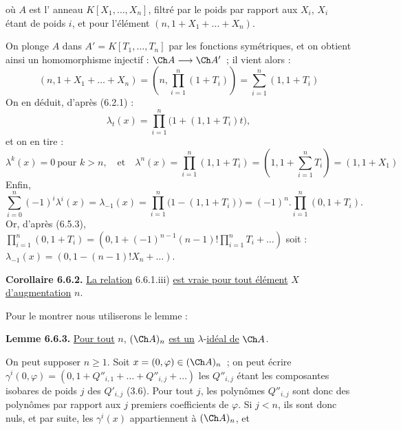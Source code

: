 
où \(A\) est l'%
anneau \(K[X_1,\ldots,X_n]\), filtré par le poids par rapport aux \(X_i\), \(X_i\) étant de poids \(i\), et pour l'élément \((n,1+X_1+\ldots+X_n)\).

On plonge \(A\) dans \(A'=K[T_1,\ldots,T_n]\) par les fonctions symétriques, et on obtient ainsi un homomorphisme injectif : \(\Ch A\longrightarrow\Ch A'\)~; il vient alors :
\[
 (n,1+X_1+\ldots+X_n)
 =
 \left(n,\prod_{i=1}^n(1+T_i)\right)
 =
 \sum_{i=1}^n(1,1+T_i)
\]
On en déduit, d'après (6.2.1) :
\[
  \lambda_t(x)=\prod_{i=1}^n\bigl(1+(1,1+T_i)t\bigr),
\]
et on en tire :
\[
  \lambda^k(x)=0\ \text{pour }k>n,\quad\text{et}\quad
  \lambda^n(x)=\prod_{i=1}^n(1,1+T_i)
   =\left(1,1+\sum_{i=1}^nT_i\right)=(1,1+X_1)
\]
Enfin,
\[
  \sum_{i=0}^n(-1)^i\lambda^i(x)=\lambda_{-1}(x)
  =
  \prod_{i=1}^n\bigl(1-(1,1+T_i)\bigr)
  =
  (-1)^n.\prod_{i=1}^n(0,1+T_i).
\]
Or, d'après (6.5.3), \(\prod_{i=1}^n(0,1+T_i)=\left(0,1+(-1)^{n-1}(n-1)!\prod_{i=1}^nT_i+\ldots\right)\)
soit : \(\lambda_{-1}(x)=(0,1-(n-1)!X_n+\ldots)\).

\textbf{Corollaire 6.6.2.} \uline{La relation} 6.6.1.iii) \uline{est vraie pour tout élément} \(X\) \uline{d'augmentation} \(n\).

Pour le montrer nous utiliserons le lemme :

\textbf{Lemme 6.6.3.} \uline{Pour tout} \(n\), \((\Ch A)_n\) \uline{est un} \(\lambda\)-\uline{idéal de} \(\Ch A\).

On peut supposer \(n\ge1\). Soit \(x=(0,\varphi)\in(\Ch A)_n\)~; on peut écrire \(\gamma^i(0,\varphi)=(0,1+Q''_{i,1}+\ldots+Q''_{i,j}+\ldots)\) les \(Q''_{i,j}\) étant les composantes isobares de poids \(j\) des \(Q'_{i,j}\) (3.6). Pour tout \(j\), les polynômes \(Q''_{i,j}\) sont donc des polynômes par rapport aux \(j\) premiers coefficients de \(\varphi\). Si \(j<n\), ils sont donc nuls, et par suite, les \(\gamma^i(x)\) appartiennent à \((\Ch A)_n\), et 

